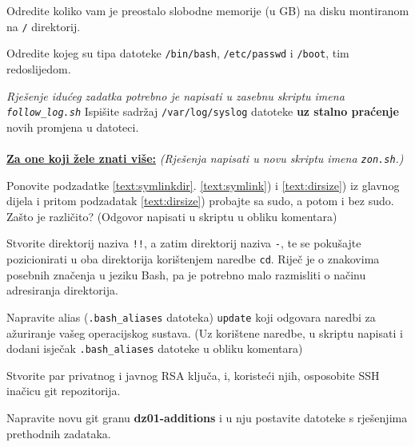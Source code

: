 \documentclass{exam}
\newcommand{\shell}[1]{\texttt{#1}}
\begin{document}
\begin{questions}

\question Odredite koliko vam je preostalo slobodne memorije (u GB) na disku montiranom na \shell{/} direktorij.

\question Odredite kojeg su tipa datoteke \shell{/bin/bash}, \shell{/etc/passwd} i \shell{/boot}, tim redoslijedom.

\textit{\newline Rješenje idućeg zadatka potrebno je napisati u zasebnu skriptu imena \shell{follow\_log.sh}}
\question Ispišite sadržaj \shell{/var/log/syslog} datoteke \textbf{uz stalno praćenje} novih promjena u datoteci.

\end{questions}
\paragraph{}
\underline{\textbf{Za one koji žele znati više:}} \textit{(Rješenja napisati u novu skriptu imena \shell{zon.sh}.)}
\begin{questions}
\item Ponovite podzadatke \ref{text:symlinkdir}. \ref{text:symlink}) i \ref{text:dirsize}) iz glavnog dijela i pritom podzadatak \ref{text:dirsize}) probajte sa sudo, a potom i bez sudo. Zašto je različito? (Odgovor napisati u skriptu u obliku komentara)
\item Stvorite direktorij naziva \shell{!!}, a zatim direktorij naziva \shell{-}, te se pokušajte pozicionirati u oba direktorija korištenjem naredbe \shell{cd}. Riječ je o znakovima posebnih značenja u jeziku Bash, pa je potrebno malo razmisliti o načinu adresiranja direktorija.
\item Napravite alias (\shell{.bash\_aliases} datoteka) \shell{update} koji odgovara naredbi za ažuriranje vašeg operacijskog sustava. (Uz korištene naredbe, u skriptu napisati i dodani isječak \shell{.bash\_aliases} datoteke u obliku komentara)
\item Stvorite par privatnog i javnog RSA ključa, i, koristeći njih, osposobite SSH inačicu git repozitorija.
\item Napravite novu git granu \textbf{dz01-additions} i u nju postavite datoteke s rješenjima prethodnih zadataka. 
\end{questions}
\end{document}
